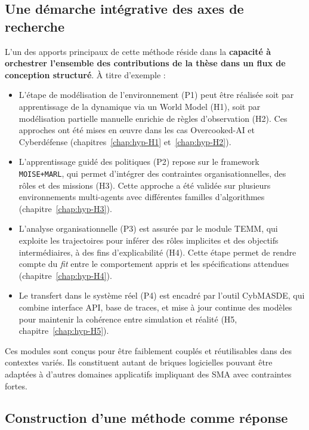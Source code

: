 \subsection{Une démarche intégrative des axes de recherche}
L'un des apports principaux de cette méthode réside dans la \textbf{capacité à orchestrer l'ensemble des contributions de la thèse dans un flux de conception structuré}. À titre d'exemple :

\begin{itemize}
    \item L'étape de modélisation de l'environnement (P1) peut être réalisée soit par apprentissage de la dynamique via un World Model (H1), soit par modélisation partielle manuelle enrichie de règles d'observation (H2). Ces approches ont été mises en œuvre dans les cas Overcooked-AI et Cyberdéfense (chapitres~\ref{chap:hyp-H1} et~\ref{chap:hyp-H2}).

    \item L'apprentissage guidé des politiques (P2) repose sur le framework \texttt{MOISE+MARL}, qui permet d'intégrer des contraintes organisationnelles, des rôles et des missions (H3). Cette approche a été validée sur plusieurs environnements multi-agents avec différentes familles d'algorithmes (chapitre~\ref{chap:hyp-H3}).

    \item L'analyse organisationnelle (P3) est assurée par le module \ac{TEMM}, qui exploite les trajectoires pour inférer des rôles implicites et des objectifs intermédiaires, à des fins d'explicabilité (H4). Cette étape permet de rendre compte du \textit{fit} entre le comportement appris et les spécifications attendues (chapitre~\ref{chap:hyp-H4}).

    \item Le transfert dans le système réel (P4) est encadré par l'outil \ac{CybMASDE}, qui combine interface API, base de traces, et mise à jour continue des modèles pour maintenir la cohérence entre simulation et réalité (H5, chapitre~\ref{chap:hyp-H5}).
\end{itemize}

Ces modules sont conçus pour être faiblement couplés et réutilisables dans des contextes variés. Ils constituent autant de briques logicielles pouvant être adaptées à d'autres domaines applicatifs impliquant des \ac{SMA} avec contraintes fortes.



\subsection{Construction d'une méthode comme réponse}


